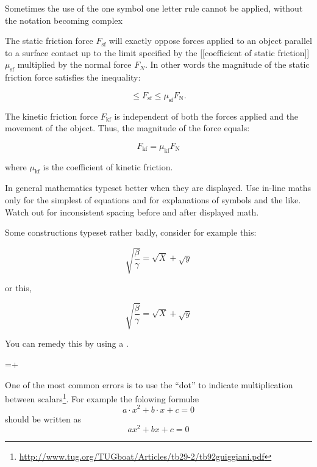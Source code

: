 {Sometimes the use of the one symbol one letter rule cannot be applied, without the notation becoming complex
\medskip

{
\narrower\narrower
The static friction force \(F_{\mathrm{sf}}\) will exactly oppose forces applied to an object parallel to a surface contact up to the limit specified by the [[coefficient of static friction]] \(\mu_{\mathrm{sf}}\) multiplied by the normal force \(F_N\). In other words the magnitude of the static friction force satisfies the inequality:

\[ \le F_{\mathrm{sf}} \le \mu_{\mathrm{sf}} F_\mathrm{N}. \]

The kinetic friction force \(F_{\mathrm{kf}}\) is independent of both the forces applied and the movement of the object. Thus, the magnitude of the force equals:

\[F_{\mathrm{kf}} = \mu_{\mathrm{kf}} F_\mathrm{N}\]

where \(\mu_{\mathrm{kf}}\) is the coefficient of kinetic friction.
}






In general mathematics typeset better when they are displayed. Use in-line maths only for the simplest of equations and for explanations of symbols and the like. Watch out for inconsistent spacing before and after displayed math.


Some \tex constructions typeset rather badly, consider for example this:

\[
\sqrt{\frac{\beta}{\gamma}} = \sqrt{X} + \sqrt{y}
\]

\noindent or this,

\[
\surd{\frac{\beta}{\gamma}} = \surd{X} + \surd{y}
\]


You can remedy this by using a .


\begin{teXX}
=+
\end{teXX}


One of the most common errors is to use the ``dot'' to indicate multiplication between scalars\footnote{\url{http://www.tug.org/TUGboat/Articles/tb29-2/tb92guiggiani.pdf}}. For example the folowing formul\ae
\[a\cdot x^2+b\cdot x+c=0\]
should be written as
\[ax^2+bx+c=0\]

}
